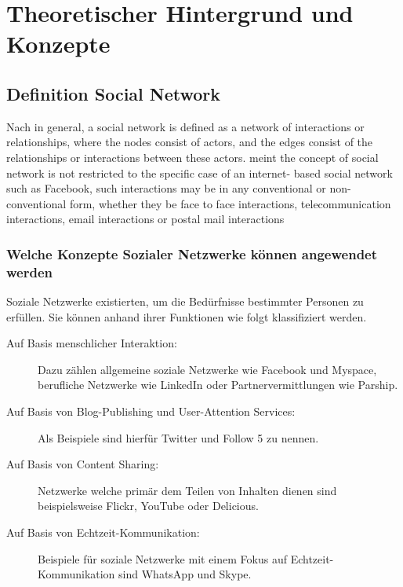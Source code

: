 
\chapter{Theoretischer Hintergrund und Konzepte}


\section{Definition Social Network}


Nach \textcite[S. 2]{aggarwal:sn} \glqq in general, a social network is defined as a network of interactions or relationships, where the nodes consist of actors, and the edges consist of the relationships or interactions between these actors.\grqq \textcite{aggarwal:sn} meint \glqq the concept of social network is not restricted to the specific case of an internet- based social network such as Facebook, such interactions may be in any conventional or non-conventional form, whether they be face to face interactions, telecommunication interactions, email interactions or postal mail interactions\grqq


\subsection{Welche Konzepte Sozialer Netzwerke können angewendet werden}

Soziale Netzwerke existierten, um die Bedürfnisse bestimmter Personen zu erfüllen. Sie können anhand ihrer Funktionen wie folgt klassifiziert werden.

\begin{description}
\item[Auf Basis menschlicher Interaktion:] Dazu zählen allgemeine soziale Netzwerke wie Facebook und Myspace, berufliche Netzwerke wie LinkedIn oder Partnervermittlungen wie Parship.
\item[Auf Basis von Blog-Publishing und User-Attention Services:] Als Beispiele sind hierfür Twitter und Follow 5 zu nennen.
\item[Auf Basis von Content Sharing:] Netzwerke welche primär dem Teilen von Inhalten dienen sind beispielsweise Flickr, YouTube oder Delicious.
\item[Auf Basis von Echtzeit-Kommunikation:] Beispiele für soziale Netzwerke mit einem Fokus auf Echtzeit-Kommunikation sind WhatsApp und Skype.
\end{description}


